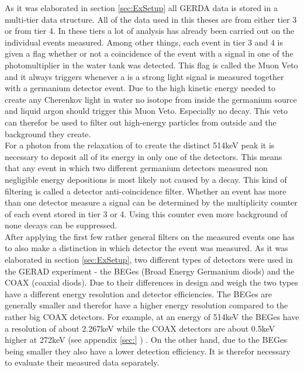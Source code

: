 As it was elaborated in section \ref{sec:ExSetup} all GERDA data is stored in a multi-tier data structure. 
All of the data used in this theses are from either tier 3 or from tier 4.
In these tiers a lot of analysis has already been carried out on the individual events measured. 
Among other things, each event in tier 3 and 4 is given a flag whether or not a coincidence of the event with a signal in one of the photomultiplier in the water tank was detected.
This flag is called the Muon Veto and it always triggers whenever a is a strong light signal is measured together with a germanium detector event.
Due to the high kinetic energy needed to create any Cherenkov light in water no isotope from inside the germanium source and liquid argon should trigger this Muon Veto.
Especially no \Kr decay. 
This veto can therefor be used to filter out high-energy particles from outside and the background they create.
\\

For a photon from the relaxation of  to create the distinct 514keV peak it is necessary to deposit all of its energy in only one of the detectors. 
This means that any event in which two different germanium detectors measured non negligible energy depositions is most likely not caused by a \Kr decay.
This kind of filtering is called a detector anti-coincidence filter.
Whether an event has more than one detector measure a signal can be determined by the multiplicity counter of each event stored in tier 3 or 4.
Using this counter even more background of none \Kr decays can be suppressed.
\\

After applying the first few rather general filters on the measured events one has to also make a distinction in which detector the event was measured.
As it was elaborated in section \ref{sec:ExSetup}, two different types of detectors were used in the GERAD experiment - the BEGes (Broad Energy Germanium diods) and the COAX (coaxial diods). 
Due to their differences in design and weigh the two types have a different energy resolution and detector efficiencies. 
The BEGes are generally smaller and therefor have a higher energy resolution compared to the rather big COAX detectors.
For example, at an energy of 514keV the BEGes have a resolution of about 2.267keV while the COAX detectors are about 0.5keV higher at 272keV (see appendix \ref{sec:} ) \cite{agostini_background_2017}. 
On the other hand, due to the BEGes being smaller they also have a lower detection efficiency.
It is therefor necessary to evaluate their measured data separately.
\\

